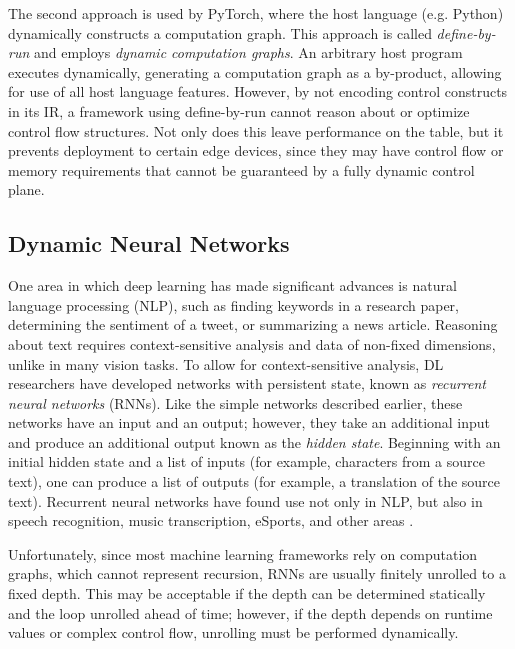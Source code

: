 The second approach is used by PyTorch, where the host language (e.g. Python) dynamically
  constructs a computation graph.
This approach is called \textit{define-by-run} and employs \textit{dynamic computation graphs}.
An arbitrary host program executes dynamically, generating a computation graph as a by-product,
  allowing for use of all host language features.
However, by not encoding control constructs in its IR, a framework
  using define-by-run cannot reason about or optimize control flow structures.
Not only does this leave performance on the table, but it prevents deployment to certain
  edge devices, since they may have control flow or memory requirements that cannot be
  guaranteed by a fully dynamic control plane.

\subsection{Dynamic Neural Networks}

One area in which deep learning has made significant advances is
  natural language processing (NLP), such as finding keywords in a
  research paper, determining the sentiment of a tweet,
  or summarizing a news article.
Reasoning about text requires context-sensitive analysis and data of
  non-fixed dimensions, unlike in many vision tasks.
To allow for context-sensitive analysis, DL researchers have developed networks with persistent
state, known as \textit{recurrent neural networks}  (RNNs). Like the simple networks described
earlier, these networks have an input and an output; however, they take an additional input and
produce an additional output known as the \textit{hidden state}. Beginning with an initial hidden
state and a list of inputs (for example, characters from a source text), one can produce a
list of outputs (for example, a translation of the source text). %
Recurrent neural networks have found use not only in NLP, but also in speech recognition, music
transcription, eSports, and other areas \citep{lstm, speech_recognition, OpenAI_dota}.

Unfortunately, since most machine learning frameworks rely on computation graphs,
  which cannot represent recursion, RNNs are usually finitely unrolled to a fixed depth.
This may be acceptable if the depth can be determined statically and the loop unrolled
  ahead of time; however, if the depth depends on runtime values or complex control flow,
  unrolling must be performed dynamically.

